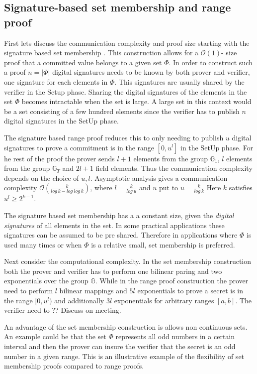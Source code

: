 \subsection{Signature-based set membership and range proof}

First lets discuss the communication complexity and proof size starting with the signature based set membership . This construction allows for a $\mathcal{O}(1)$- size proof that a committed value belongs to a given set $\Phi$. In order to construct such a proof $n=|\Phi|$ digital signatures needs to be known by both prover and verifier, one signature for each elements in $\Phi$. This signatures are usually shared by the verifier in the Setup phase. Sharing the digital signatures of the elements in the set $\Phi$ becomes intractable when the set is large.  A large set in this context would be a set consisting of a few hundred elements since the verifier has to publish $n$ digital signatures in the SetUp phase. 

The signature based range proof reduces this to only needing to publish $u$ digital signatures to prove a commitment is in the range $[0,u^l]$ in the SetUp phase. For he rest of the proof the prover sends $l+1$ elements from the group $\mathds{G}_1$, $l$ elements from the group $\mathds{G}_T$ and $2l+1$ field elements. 
Thus the communication complexity depends on the choice of $u,l$. Asymptotic analysis gives a communication complexity $\mathcal{O}(\frac{k}{log\:k-log\:log\:k})$, where $l=\frac{k}{log\:u}$ and $u$ put to $u=\frac{k}{log\: k}$ Here $k$ satisfies $u^l \geq 2^{k-1}$.

The signature based set membership has a a constant size, given the \textit{digital signatures} of all elements in the set. In some practical applications these signatures can be assumed to be pre shared. Therefore in applications where $\Phi$ is used many times  or when $\Phi$ is a relative small, set membership is preferred.


Next consider the computational complexity.  In the set membership construction both the prover and verifier has to perform one bilinear paring and two  exponentials over the group $\mathds{G}$. While in the range proof construction the prover need to perform $l$ bilinear mappings and $5l$ exponentials to prove a secret is in the range $[0,u^l)$ and additionally $3l$ exponentials for arbitrary ranges $[a,b]$. The verifier need to ?? Discuss on meeting.
 
An advantage of the set membership construction is allows non continuous sets. An example could be that the set $\Phi$ represents all odd numbers in a certain interval and then the prover can insure the verifier that the secret is an odd number in a given range. This is an illustrative example of the flexibility of set membership proofs compared to range proofs.

